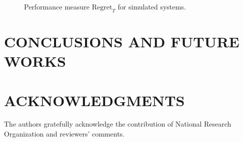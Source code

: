 \documentclass{article}
\begin{document}
\begin{figure}
{    \label{fig:PhysSysDisReg}}
    \caption{Performance measure $\text{Regret}_{T}$ for simulated systems.}
\end{figure}


\section{CONCLUSIONS AND FUTURE WORKS}

\section{ACKNOWLEDGMENTS}

The authors gratefully acknowledge the contribution of National Research Organization and reviewers' comments.



\appendix
\end{document}
